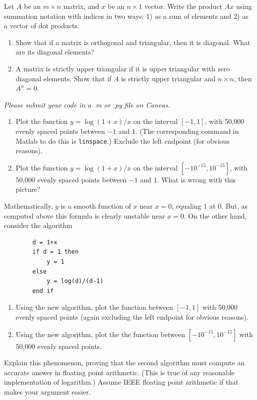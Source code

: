 \documentclass{ximera}
\begin{document}
\begin{exercise}
    Let $A$ be an $m \times n$ matrix, and $x$ be an $n \times 1$ vector.  Write the product $Ax$ using summation notation with indices in two ways: 1) as a sum of elements and 2) as a vector of dot products.
\end{exercise}

\begin{exercise}

\begin{enumerate}
    \item Show that if a matrix is orthogonal and triangular, then it is diagonal.  What are its diagonal elements?
    \item A matrix is strictly upper triangular if it is upper triangular with zero diagonal elements.  Show that if $A$ is strictly upper triangular and $n \times n$, then $A^n = 0$.
\end{enumerate}
\end{exercise}

\begin{exercise}
\textit{Please submit your code in a .m or .py file on Canvas.}
    \begin{enumerate}
    \item Plot the function $y = \log(1+x)/x$ on the interval $[-1,1]$, with 50,000 evenly spaced points between $-1$ and $1$.  (The corresponding command in Matlab to do this is \verb|linspace|.)  Exclude the left endpoint (for obvious reasons).
    \item Plot the function $y = \log(1+x)/x$ on the interval $[-10^{-15},10^{-15}]$, with 50,000 evenly spaced points between $-1$ and $1$.  What is wrong with this picture?
    \end{enumerate}
     Mathematically, $y$ is a smooth function of $x$ near $x = 0$, equaling $1$ at $0$.  But, as computed above this formula is clearly unstable near $x = 0$.  On the other hand, consider the algorithm
    \begin{verbatim}
        d = 1+x
        if d = 1 then 
            y = 1
        else
            y = log(d)/(d-1)
        end if
    \end{verbatim}  
    \begin{enumerate}
        \item Using the new algorithm, plot the function between $[-1,1]$ with 50,000 evenly spaced points (again excluding the left endpoint for obvious reasons). 
        \item Using the new algorithm, plot the the function between $[-10^{-15},10^{-15}]$ with 50,000 evenly spaced points.
    \end{enumerate}
    
    Explain this phenomenon, proving that the second algorithm must compute an accurate answer in floating point arithmetic.  (This is true of any reasonable implementation of logarithm.)  Assume IEEE floating point arithmetic if that makes your argument easier. 

\end{exercise}
\end{document}
